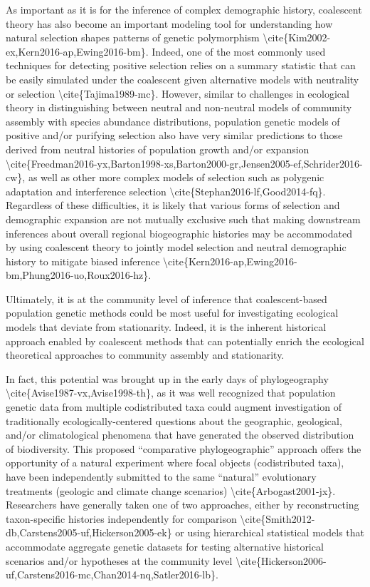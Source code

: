 \documentclass[]{article}
\begin{document}
As important as it is for the inference of complex demographic history,
coalescent theory has also become an important modeling tool for
understanding how natural selection shapes patterns of genetic
polymorphism
\textbackslash{}cite\{Kim2002-ex,Kern2016-ap,Ewing2016-bm\}. Indeed, one
of the most commonly used techniques for detecting positive selection
relies on a summary statistic that can be easily simulated under the
coalescent given alternative models with neutrality or selection
\textbackslash{}cite\{Tajima1989-mc\}. However, similar to challenges in
ecological theory in distinguishing between neutral and non-neutral
models of community assembly with species abundance distributions,
population genetic models of positive and/or purifying selection also
have very similar predictions to those derived from neutral histories of
population growth and/or expansion
\textbackslash{}cite\{Freedman2016-yx,Barton1998-xs,Barton2000-gr,Jensen2005-ef,Schrider2016-cw\},
as well as other more complex models of selection such as polygenic
adaptation and interference selection
\textbackslash{}cite\{Stephan2016-lf,Good2014-fq\}. Regardless of these
difficulties, it is likely that various forms of selection and
demographic expansion are not mutually exclusive such that making
downstream inferences about overall regional biogeographic histories may
be accommodated by using coalescent theory to jointly model selection
and neutral demographic history to mitigate biased inference
\textbackslash{}cite\{Kern2016-ap,Ewing2016-bm,Phung2016-uo,Roux2016-hz\}.

Ultimately, it is at the community level of inference that
coalescent-based population genetic methods could be most useful for
investigating ecological models that deviate from stationarity. Indeed,
it is the inherent historical approach enabled by coalescent methods
that can potentially enrich the ecological theoretical approaches to
community assembly and stationarity.

In fact, this potential was brought up in the early days of
phylogeography \textbackslash{}cite\{Avise1987-vx,Avise1998-th\}, as it
was well recognized that population genetic data from multiple
codistributed taxa could augment investigation of traditionally
ecologically-centered questions about the geographic, geological, and/or
climatological phenomena that have generated the observed distribution
of biodiversity. This proposed ``comparative phylogeographic'' approach
offers the opportunity of a natural experiment where focal objects
(codistributed taxa), have been independently submitted to the same
``natural'' evolutionary treatments (geologic and climate change
scenarios) \textbackslash{}cite\{Arbogast2001-jx\}. Researchers have
generally taken one of two approaches, either by reconstructing
taxon-specific histories independently for comparison
\textbackslash{}cite\{Smith2012-db,Carstens2005-uf,Hickerson2005-ek\} or
using hierarchical statistical models that accommodate aggregate genetic
datasets for testing alternative historical scenarios and/or hypotheses
at the community level
\textbackslash{}cite\{Hickerson2006-uf,Carstens2016-mc,Chan2014-nq,Satler2016-lb\}.
\end{document}
